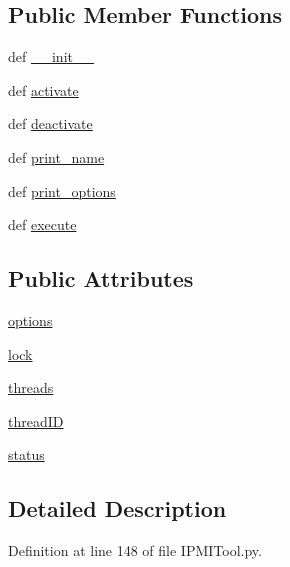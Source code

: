 \subsection*{Public Member Functions}
\begin{DoxyCompactItemize}
\item 
def \hyperlink{classIPMITool_1_1IPMITool_a5de40b2861cf82d75b68d65a00f56fd7}{\-\_\-\-\_\-init\-\_\-\-\_\-}
\item 
def \hyperlink{classIPMITool_1_1IPMITool_a7033e64733a6165c392c71159c75405c}{activate}
\item 
def \hyperlink{classIPMITool_1_1IPMITool_a7639dc29d494f89f9cd00c164984a014}{deactivate}
\item 
def \hyperlink{classIPMITool_1_1IPMITool_ad99bf0f2639b3f838e1c94efd64e24ad}{print\-\_\-name}
\item 
def \hyperlink{classIPMITool_1_1IPMITool_a40df31a86acffb30ca43ab938bd936ab}{print\-\_\-options}
\item 
def \hyperlink{classIPMITool_1_1IPMITool_a308c802b6dcf01604da2538f72cb2126}{execute}
\end{DoxyCompactItemize}
\subsection*{Public Attributes}
\begin{DoxyCompactItemize}
\item 
\hyperlink{classIPMITool_1_1IPMITool_a9f0f9484b1b8f6a0df8338f7894c8823}{options}
\item 
\hyperlink{classIPMITool_1_1IPMITool_a36a9429fca7200e0a6d1d78002b95d11}{lock}
\item 
\hyperlink{classIPMITool_1_1IPMITool_a2f6ca8b0b509ba2c514b72312841b2d6}{threads}
\item 
\hyperlink{classIPMITool_1_1IPMITool_aaa15d2dc90d9e3a45adc4519912c811d}{thread\-I\-D}
\item 
\hyperlink{classIPMITool_1_1IPMITool_a4dba85133ceca9edff481c575cb468d9}{status}
\end{DoxyCompactItemize}


\subsection{Detailed Description}


Definition at line 148 of file I\-P\-M\-I\-Tool.\-py.



